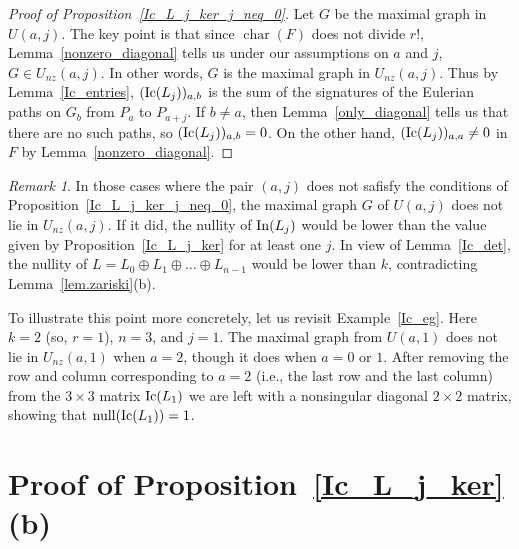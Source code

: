 \documentclass{amsproc}
\theoremstyle{definition}
\theoremstyle{remark}
\newtheorem{remark}[theorem]{Remark}
\numberwithin{equation}{section}
\newcommand{\In}{{\rm In}}
\newcommand{\Ic}{{\rm Ic}}
\newcommand{\nullity}{{\rm null}}
\begin{document}
\begin{proof}[Proof of Proposition~\ref{Ic_L_j_ker_j_neq_0}] Let $G$ be the maximal graph in $U(a, j)$. The key point is that
since $\operatorname{char}(F)$ does not divide $r!$, Lemma~\ref{nonzero_diagonal} tells us 
under our assumptions on $a$ and $j$, $G \in U_{nz}(a, j)$. In other words, $G$ is the maximal graph in $U_{nz}(a, j)$. Thus
by Lemma~\ref{Ic_entries}, $(\Ic(L_j))_{a, b}$ is the sum of the signatures of the Eulerian paths on $G_b$ from $P_a$ to
$P_{a+j}$. If $b \neq a$, then Lemma~\ref{only_diagonal} tells us that there are no such paths, so $(\Ic(L_j))_{a, b} = 0$.
On the other hand, $(\Ic(L_j))_{a, a} \neq 0$ in $F$ by Lemma~\ref{nonzero_diagonal}.
\end{proof}

\begin{remark}
In those cases where the pair $(a, j)$ does not safisfy the conditions of Proposition~\ref{Ic_L_j_ker_j_neq_0},
the maximal graph $G$ of $U(a, j)$ does not lie in $U_{nz}(a,j)$. If it did, the nullity of $\In(L_j)$ would be lower than the value given by
Proposition~\ref{Ic_L_j_ker} for at least one $j$. In view of Lemma~\ref{Ic_det}, the nullity of $L = L_0 \oplus L_1 \oplus \ldots \oplus L_{n-1}$ 
would be lower than $k$, contradicting Lemma~\ref{lem.zariski}(b).

To illustrate this point more concretely, let us revisit Example~\ref{Ic_eg}. Here $k=2$ (so, $r = 1$), $n=3$, and $j = 1$.
The maximal graph from $U(a,1)$ does not lie in $U_{nz}(a,1)$ when $a=2$, though it does when $a=0$ or $1$. 
After removing the row and column corresponding to $a=2$ (i.e., the last row and the last column) 
from the $3 \times 3$ matrix $\Ic(L_1)$ we are
left with a nonsingular diagonal $2 \times 2$ matrix, showing that $\nullity(\Ic(L_1))=1$.
\end{remark}


\section{Proof of Proposition~\ref{Ic_L_j_ker}(b)}
\label{section_j_0}

\newcommand{\LT}{\mathcal{L}} %
\newcommand{\UT}{\mathcal{U}} %
\end{document}
